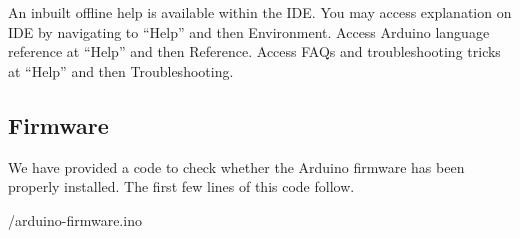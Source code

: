 An inbuilt offline help is available within the IDE. You may access
explanation on IDE by navigating to ``Help'' and then
Environment. Access Arduino language reference at ``Help'' and then
Reference. Access FAQs and troubleshooting tricks at ``Help'' and then
Troubleshooting.

\subsection{Firmware}
We have provided a code to check whether the Arduino firmware has been
properly installed.  The first few lines of this code follow. 

\begin{ardcode}
      \label{ard:firmware}
      
      {\LocSWfirmcode/arduino-firmware.ino}
\end{ardcode}



